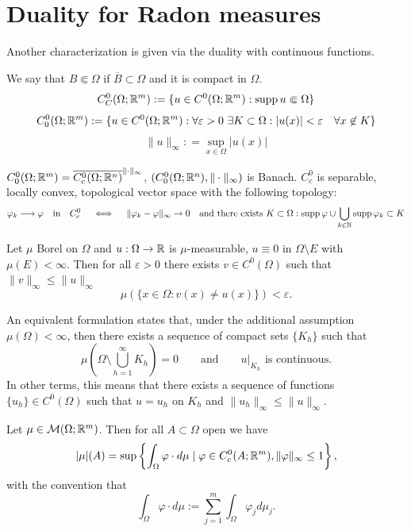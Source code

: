 \section{Duality for Radon measures}

Another characterization is given via the duality with continuous functions.

\begin{definition}
We say that $B \Subset \Omega$ if $\overline{B} \subset \Omega$ and it is
compact in $\Omega$.
\[
C^0_C(\Omega; \mathbb{R}^m) := \{u \in C^0(\Omega;\mathbb{R}^m) : \operatorname{supp} u \Subset \Omega \}
\]
\[
C^0_0(\Omega; \mathbb{R}^m) := \{u \in C^0(\Omega;\mathbb{R}^m) : \forall \varepsilon > 0 \
\exists K \subset \Omega: |u(x)| < \varepsilon \quad \forall x \not\in K 
\}
\]
\[
\|u\|_{\infty} : = \sup_{x \in \Omega} |u(x)|
\]
\end{definition}

\begin{remark}
$C^0_0(\Omega;\mathbb{R}^m) = \overline{C^0_c(\Omega;\mathbb{R}^n)}^{\|\cdot\|_\infty}$,
$(C^0_0(\Omega;\mathbb{R}^n),\|\cdot\|_\infty)$ is Banach.
$C^0_c$ is separable, locally convex, topological vector space with the
following topology:
\[
\varphi_k \longrightarrow \varphi \quad \text{in} \quad C^0_c 
\quad \iff \quad
\|\varphi_k - \varphi\|_\infty \to 0
\quad \text{and there exists } K \subset \Omega:
\operatorname{supp} \varphi \cup \bigcup_{k\in\mathbb{N}} \operatorname{supp} \varphi_k \subset K
\]
\end{remark}

\begin{theorem}[Lusin]
Let $\mu$ Borel on $\Omega$ and $u : \Omega \to \mathbb{R}$ is $\mu$-measurable, $u
\equiv 0$ in $\Omega \setminus E$ with $\mu(E) < \infty$. Then for all
$\varepsilon > 0$ there exists $v \in C^0(\Omega)$ such that $\|v\|_\infty
\leq \|u\|_\infty$
\[
\mu(\{x \in \Omega: v(x) \neq u(x)\}) < \varepsilon.
\]
\end{theorem}

\begin{remark}
An equivalent formulation states that, under the additional assumption
$\mu(\Omega) < \infty$, then there exists a sequence of compact sets $\{K_h\}$ such that
\[
\mu \left (\Omega \setminus \bigcup_{h = 1}^{\infty} K_h \right ) = 0
\qquad \text{and} \qquad
u\big|_{K_h} \text{ is continuous}.
\]
In other terms, this means that there exists a sequence of functions $\{u_h\} \in C^0(\Omega)$ such that $u = u_h$ on $K_h$ and $\|u_h\|_\infty
\leq \|u\|_\infty$.
\end{remark}

\begin{proposition} \label{prop:characterization_tot_var}
Let $\mu \in \mathcal{M}(\Omega;\mathbb{R}^m)$. Then for all $A\subset \Omega$ open we have 
\begin{equation} \label{eq:tot_var_characterization}
|\mu|(A) = \sup\left\{ \int_\Omega \varphi \cdot d\mu \mid 
\varphi \in C^0_c(A;\mathbb{R}^m), \|\varphi\|_\infty \leq 1\right\},
\end{equation}
with the convention that
\[
\int_\Omega \varphi \cdot d\mu := \sum_{j=1}^m \int_\Omega \varphi_j d\mu_j.
\]
\end{proposition}

